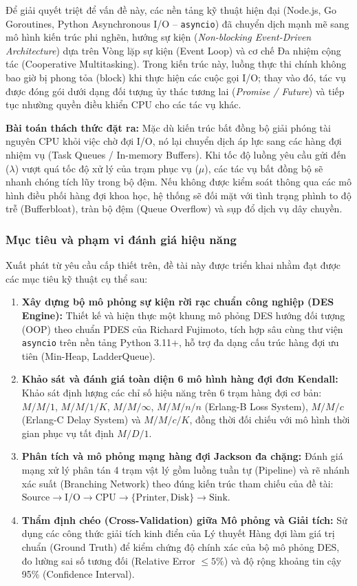Để giải quyết triệt để vấn đề này, các nền tảng kỹ thuật hiện đại (Node.js, Go Goroutines, Python Asynchronous I/O -- \texttt{asyncio}) đã chuyển dịch mạnh mẽ sang mô hình kiến trúc phi nghẽn, hướng sự kiện (\textit{Non-blocking Event-Driven Architecture}) dựa trên Vòng lặp sự kiện (Event Loop) và cơ chế Đa nhiệm cộng tác (Cooperative Multitasking). Trong kiến trúc này, luồng thực thi chính không bao giờ bị phong tỏa (block) khi thực hiện các cuộc gọi I/O; thay vào đó, tác vụ được đóng gói dưới dạng đối tượng ủy thác tương lai (\textit{Promise / Future}) và tiếp tục nhường quyền điều khiển CPU cho các tác vụ khác.

\textbf{Bài toán thách thức đặt ra:} Mặc dù kiến trúc bất đồng bộ giải phóng tài nguyên CPU khỏi việc chờ đợi I/O, nó lại chuyển dịch áp lực sang các hàng đợi nhiệm vụ (Task Queues / In-memory Buffers). Khi tốc độ luồng yêu cầu gửi đến ($\lambda$) vượt quá tốc độ xử lý của trạm phục vụ ($\mu$), các tác vụ bất đồng bộ sẽ nhanh chóng tích lũy trong bộ đệm. Nếu không được kiểm soát thông qua các mô hình điều phối hàng đợi khoa học, hệ thống sẽ đối mặt với tình trạng phình to độ trễ (Bufferbloat), tràn bộ đệm (Queue Overflow) và sụp đổ dịch vụ dây chuyền.

\subsubsection{Mục tiêu và phạm vi đánh giá hiệu năng}

\hspace{0.5cm}Xuất phát từ yêu cầu cấp thiết trên, đề tài này được triển khai nhằm đạt được các mục tiêu kỹ thuật cụ thể sau:
\begin{enumerate}[leftmargin=1.5em]
    \item \textbf{Xây dựng bộ mô phỏng sự kiện rời rạc chuẩn công nghiệp (DES Engine):} Thiết kế và hiện thực một khung mô phỏng DES hướng đối tượng (OOP) theo chuẩn PDES của Richard Fujimoto, tích hợp sâu cùng thư viện \texttt{asyncio} trên nền tảng Python 3.11+, hỗ trợ đa dạng cấu trúc hàng đợi ưu tiên (Min-Heap, LadderQueue).
    \item \textbf{Khảo sát và đánh giá toàn diện 6 mô hình hàng đợi đơn Kendall:} Khảo sát định lượng các chỉ số hiệu năng trên 6 trạm hàng đợi cơ bản: $M/M/1$, $M/M/1/K$, $M/M/\infty$, $M/M/n/n$ (Erlang-B Loss System), $M/M/c$ (Erlang-C Delay System) và $M/M/c/K$, đồng thời đối chiếu với mô hình thời gian phục vụ tất định $M/D/1$.
    \item \textbf{Phân tích và mô phỏng mạng hàng đợi Jackson đa chặng:} Đánh giá mạng xử lý phân tán 4 trạm vật lý gồm luồng tuần tự (Pipeline) và rẽ nhánh xác suất (Branching Network) theo đúng kiến trúc tham chiếu của đề tài: $\text{Source} \to \text{I/O} \to \text{CPU} \to \{\text{Printer}, \text{Disk}\} \to \text{Sink}$.
    \item \textbf{Thẩm định chéo (Cross-Validation) giữa Mô phỏng và Giải tích:} Sử dụng các công thức giải tích kinh điển của Lý thuyết Hàng đợi làm giá trị chuẩn (Ground Truth) để kiểm chứng độ chính xác của bộ mô phỏng DES, đo lường sai số tương đối (Relative Error $\le 5\%$) và độ rộng khoảng tin cậy 95\% (Confidence Interval).
\end{enumerate}


